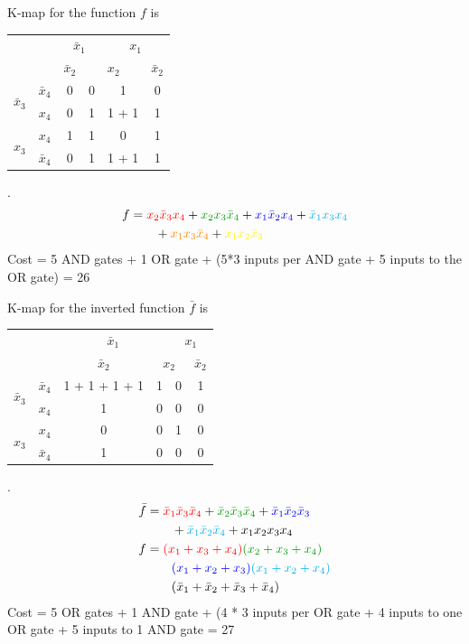 \documentclass{article}
\newcommand{\bx}{\bar{x}}
\newcommand{\cred}{\color{red}}
\newcommand{\cg}{\color{green!60!black}}
\newcommand{\cb}{\color{blue}}
\begin{document}
K-map for the function $f$ is
\\
\begin{tabular}{c|c|c|c|c|c}
  \toprule
  && \multicolumn{2}{c|}{$\bx_1$} & \multicolumn{2}{c}{$x_1$}
  \\
  && $\bx_2$ & \multicolumn{2}{c|}{$x_2$} & $\bx_2$
  \\ \midrule
  \multirow{2}{*}{$\bx_3$} & $\bx_4$
                                  & 0 & 0 &  \color{yellow} 1 & 0
  \\
  & $x_4$
                                  & 0 & \cred 1 & \cred 1 + \color{yellow} 1 & \cb 1
  \\
  \multirow{2}{*}{$x_3$}   &  $x_4$
                                  & \color{cyan} 1 & \color{cyan} 1 & 0 & \cb 1
  \\
  & $\bx_4$
                                  & 0 & \cg 1 & \cg 1 + \color{orange} 1 & \color{orange} 1
  \\\bottomrule
\end{tabular}.
\\
\begin{align*}
f &= { \cred x_2 \bx_3 x_4 } +  { \cg x_2 x_3 \bx_4} + {\cb x_1 \bx_2 x_4} +
  {\color{cyan} \bx_1 x_3 x_4 }
  \\
  &\qquad + {\color{orange} x_1 x_3 \bx_4} +
{\color{yellow} x_1 x_2 \bx_3 }
  \end{align*}
 Cost = 5 AND gates + 1 OR gate + (5*3 inputs per AND gate + 5 inputs to the OR
 gate) = 26

 K-map for the inverted function $\bar{f}$ is
 \\
 \begin{tabular}{c|c|c|c|c|c}
   \toprule
   && \multicolumn{2}{c|}{$\bx_1$} & \multicolumn{2}{c}{$x_1$}
   \\
   && $\bx_2$ & \multicolumn{2}{c|}{$x_2$} & $\bx_2$
   \\ \midrule
   \multirow{2}{*}{$\bx_3$} & $\bx_4$
                                   & \cred 1 + \cg 1 + \cb 1 + \color{cyan} 1 & \cred 1 &  0 &  \cg 1
   \\
   & $x_4$
                                   & \cb 1 & 0 & 0 & 0
   \\
   \multirow{2}{*}{$x_3$}   &  $x_4$
                                   & 0 & 0 & 1 & 0
   \\
   & $\bx_4$
                                   & \color{cyan} 1 & 0 & 0 & 0
   \\\bottomrule
 \end{tabular}.
 \\
 \begin{align*}
   \bar{f} &= {\cred \bx_1 \bx_3 \bx_4 } + {\cg \bx_2 \bx_3 \bx_4} + {\cb \bx_1 \bx_2 \bx_3 }
   \\
   &\qquad + {\color{cyan} \bx_1 \bx_2 \bx_4 } + x_1 x_2 x_3 x_4
   \\
   f &= {\cred (x_1 + x_3 + x_4) } {\cg (x_2 + x_3 + x_4)} 
   \\
           &\qquad {\cb (x_1 + x_2 + x_3)}{\color{cyan} (x_1 + x_2 + x_4)}
   \\
   &\qquad (\bx_1 + \bx_2+ \bx_3 + \bx_4)
 \end{align*}
 Cost = 5 OR gates + 1 AND gate + (4 * 3 inputs per OR gate + 4 inputs to one OR
 gate + 5 inputs to 1 AND gate = 27
\end{document}
